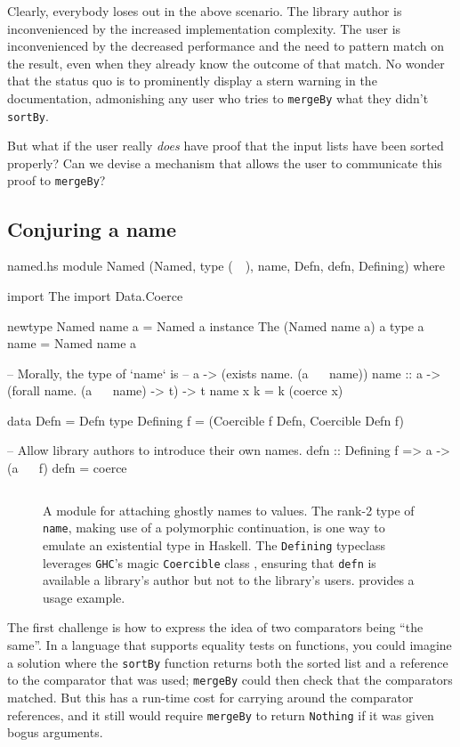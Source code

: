 \documentclass[format=sigplan, review=false, screen=true]{acmart}
\begin{document}
Clearly, everybody loses out in the above scenario. The
library author is inconvenienced by the increased implementation complexity.
The user is inconvenienced by the decreased performance and the need to
pattern match on the result, even when they  already know the
outcome of that match. No wonder that the status quo is to prominently display
a stern warning in the documentation, admonishing
any user who tries to \texttt{mergeBy} what they didn't \texttt{sortBy}.

But what if the user really \emph{does} have proof that the input lists have
been sorted properly? Can we devise a mechanism that allows the user to communicate
this proof to \texttt{mergeBy}?

\subsection{Conjuring a name}

\begin{filecontents*}{named.hs}
module Named
  (Named, type (~~), name, Defn, defn, Defining) where

import The
import Data.Coerce

newtype Named name a = Named a
instance The (Named name a) a
type a ~~ name = Named name a

-- Morally, the type of `name` is
--      a -> (exists name. (a ~~ name))
name :: a -> (forall name. (a ~~ name) -> t) -> t
name x k = k (coerce x)

data Defn = Defn
type Defining f = (Coercible f Defn, Coercible Defn f)

-- Allow library authors to introduce their own names.
defn :: Defining f => a -> (a ~~ f)
defn = coerce
\end{filecontents*}
\begin{figure}[b]
  \inputminted{haskell}{named.hs}
  \caption{A module for attaching ghostly names to values. The rank-2 type of \texttt{name},
    making use of a polymorphic continuation, is one way to emulate an existential type in
    Haskell. The \texttt{Defining} typeclass
    leverages \texttt{GHC}'s magic \texttt{Coercible} class \cite{Breitner:2014:SZC:2692915.2628141},
    ensuring that \texttt{defn} is available a library's author but not
    to the library's users.  provides a usage example.\label{name-module}}
\end{figure}


The first challenge is how to express the idea of two  comparators
being ``the same''. In a language that supports equality tests on functions,
you could imagine a solution where the \texttt{sortBy} function returns both the sorted
list and a reference to the comparator that was used; \texttt{mergeBy} could
then check that the comparators matched. But this has a run-time cost for carrying
around the comparator references, and it still would require \texttt{mergeBy} to
return \texttt{Nothing} if it was given bogus arguments.
\end{document}
